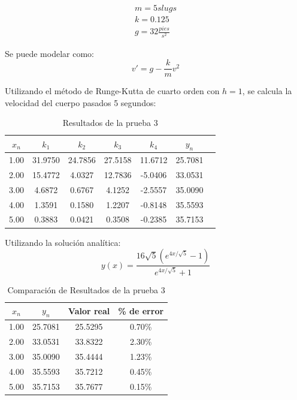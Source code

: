 \documentclass[article, 11pt]{IEEEtran}   %
\begin{document}
\begin{gather*}
m=5slugs\\
k=0.125\\
g=32\frac{pies}{s^2}
\end{gather*}

Se puede modelar como:
\begin{equation}
v\prime=g-\frac{k}{m}v^2
\end{equation}

Utilizando el método de Runge-Kutta de cuarto orden con $h=1$, se calcula la velocidad del cuerpo pasados 5 segundos:

\begin{table}[H]
\centering
\caption{Resultados de la prueba 3}
\label{DataTable3}
\begin{tabular}{|c|c|c|c|c|c|c|}
\hline
$x_n$ & $k_1$ & $k_2$ & $k_3$ & $k_4$ & $y_n$ \\
\hline
1.00 & 31.9750 & 24.7856 & 27.5158 & 11.6712 & 25.7081\\
2.00 & 15.4772 & 4.0327 & 12.7836 & -5.0406 & 33.0531\\
3.00 & 4.6872 & 0.6767 & 4.1252 & -2.5557 & 35.0090\\
4.00 & 1.3591 & 0.1580 & 1.2207 & -0.8148 & 35.5593\\
5.00 & 0.3883 & 0.0421 & 0.3508 & -0.2385 & 35.7153\\
\hline   
\end{tabular}
\end{table}

Utilizando la solución analítica:
\begin{equation}
y(x)=\frac{16\sqrt5(e^{4x/\sqrt5}-1)}{e^{4x/\sqrt5}+1}
\end{equation}
\newpage

\begin{table}[H]
\centering
\caption{Comparación de Resultados de la prueba 3}
\label{DataTable4}
\begin{tabular}{|c|c|c|c|}
\hline
$x_n$ & $y_n$ & Valor real & \% de error \\
\hline
1.00 & 25.7081 & 25.5295 & 0.70\%\\
2.00 & 33.0531 & 33.8322 & 2.30\%\\
3.00 & 35.0090 & 35.4444 & 1.23\%\\
4.00 & 35.5593 & 35.7212 & 0.45\%\\
5.00 & 35.7153 & 35.7677 & 0.15\%\\
\hline   
\end{tabular}
\end{table}
\end{document}
